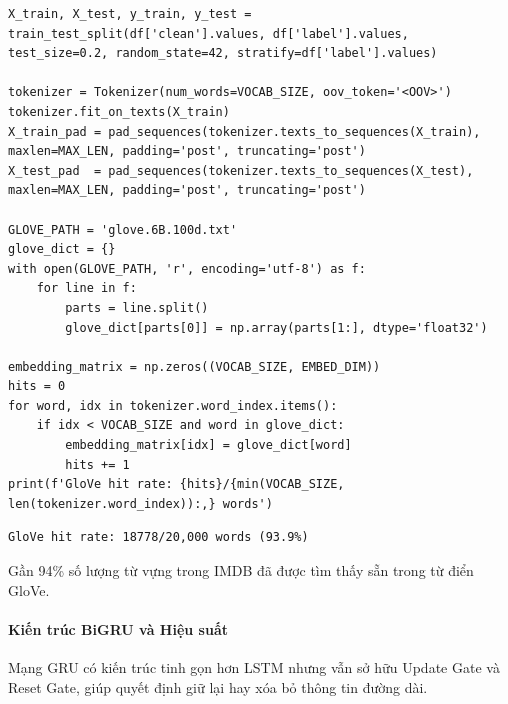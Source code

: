 \begin{lstlisting}[style=pythoncode, caption={Sử dụng Tokenizer và Load ma trận GloVe}]
X_train, X_test, y_train, y_test = train_test_split(df['clean'].values, df['label'].values, test_size=0.2, random_state=42, stratify=df['label'].values)

tokenizer = Tokenizer(num_words=VOCAB_SIZE, oov_token='<OOV>')
tokenizer.fit_on_texts(X_train)
X_train_pad = pad_sequences(tokenizer.texts_to_sequences(X_train), maxlen=MAX_LEN, padding='post', truncating='post')
X_test_pad  = pad_sequences(tokenizer.texts_to_sequences(X_test), maxlen=MAX_LEN, padding='post', truncating='post')

GLOVE_PATH = 'glove.6B.100d.txt'
glove_dict = {}
with open(GLOVE_PATH, 'r', encoding='utf-8') as f:
    for line in f:
        parts = line.split()
        glove_dict[parts[0]] = np.array(parts[1:], dtype='float32')

embedding_matrix = np.zeros((VOCAB_SIZE, EMBED_DIM))
hits = 0
for word, idx in tokenizer.word_index.items():
    if idx < VOCAB_SIZE and word in glove_dict:
        embedding_matrix[idx] = glove_dict[word]
        hits += 1
print(f'GloVe hit rate: {hits}/{min(VOCAB_SIZE, len(tokenizer.word_index)):,} words')
\end{lstlisting}

\begin{lstlisting}[style=consoleoutput, caption={Output: Khớp từ vựng với GloVe}]
GloVe hit rate: 18778/20,000 words (93.9%)
\end{lstlisting}
Gần 94\% số lượng từ vựng trong IMDB đã được tìm thấy sẵn trong từ điển GloVe.

\paragraph{Kiến trúc BiGRU và Hiệu suất} \hfill\mbox{}

Mạng GRU có kiến trúc tinh gọn hơn LSTM nhưng vẫn sở hữu Update Gate và Reset Gate, giúp quyết định giữ lại hay xóa bỏ thông tin đường dài. 

